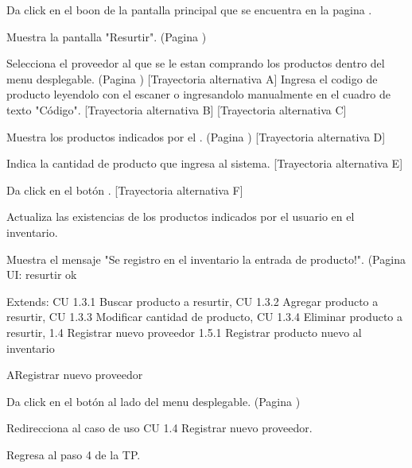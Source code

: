 \begin{UCtrayectoria}
	
	\UCpaso [\UCactor] Da click en el boon  de la pantalla principal que se encuentra en la pagina \pageref{UI: menu principal}.
	
	\UCpaso [\UCsist] Muestra la pantalla "Resurtir". (Pagina \pageref{UI: resurtir vacio})
	
	\UCpaso [\UCactor] Selecciona el proveedor al que se le estan comprando los productos dentro del menu desplegable. (Pagina \pageref{UI: seleccionar proveedor}) [Trayectoria alternativa A]
	\UCpaso [\UCactor] Ingresa el codigo de producto leyendolo con el escaner o ingresandolo manualmente en el cuadro de texto "Código". [Trayectoria alternativa B] [Trayectoria alternativa C] 

	\UCpaso [\UCsist] Muestra los productos indicados por el \UCactor.  (Pagina \pageref{UI: resurtir lleno}) [Trayectoria alternativa D]

	\UCpaso [\UCactor] Indica la cantidad de producto que ingresa al sistema. [Trayectoria alternativa E]
	
	\UCpaso [\UCactor] Da click en el botón . [Trayectoria alternativa F]

	\UCpaso [\UCsist] Actualiza las existencias de los productos indicados por el usuario en el inventario.

	\UCpaso [\UCsist] Muestra el mensaje "Se registro en el inventario la entrada de producto!". (Pagina {UI: resurtir ok}
	
	Extends: CU 1.3.1 Buscar producto a resurtir, CU 1.3.2 Agregar producto a resurtir, CU 1.3.3 Modificar cantidad de producto, CU 1.3.4 Eliminar producto a resurtir, 1.4 Registrar nuevo proveedor 1.5.1 Registrar producto nuevo al inventario
	
\end{UCtrayectoria}



\begin{UCtrayectoriaA}{A}{Registrar nuevo proveedor}
	
	\UCpaso[\UCactor] Da click en el botón  al lado del menu desplegable. (Pagina \pageref{UI: resurtir vacio})

	\UCpaso[\UCsist] Redirecciona al caso de uso CU 1.4 Registrar nuevo proveedor.

	\UCpaso[\UCsist] Regresa al paso 4 de la TP.
	
\end{UCtrayectoriaA}

